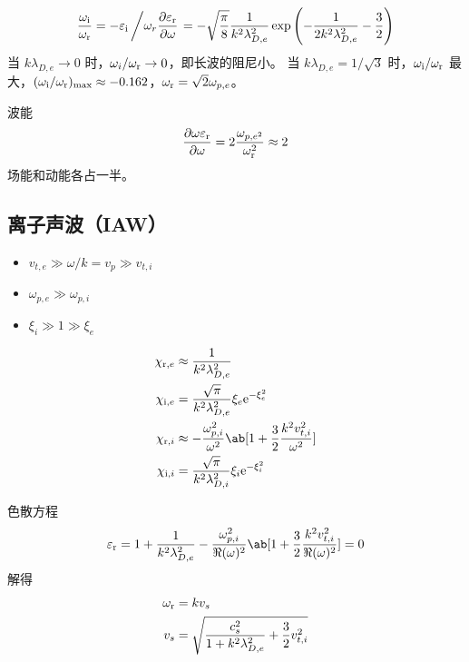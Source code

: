 \begin{equation}
\frac{\omega_{\mathrm{i}}}{\omega_{\mathrm{r}}} = - \varepsilon_{\mathrm{i}} \left/ \omega_r \pdv{\varepsilon_{\mathrm{r}}}{\omega}\right.
= - \sqrt{\frac{\pi}{8}} \frac{1}{k^2 \lambda_{D,e}^2} \exp\left(- \frac{1}{2 k^2 \lambda_{D,e}^2} - \frac{3}{2}\right)
\end{equation}
当 $k \lambda_{D,e} \to 0$ 时，$\omega_i / \omega_{\mathrm{r}} \to 0$，即长波的阻尼小。
当 $k \lambda_{D,e} = 1 / \sqrt{3}{}$ 时，$\omega_{\mathrm{i}} / \omega_{\mathrm{r}}$ 最大，$(\omega_{\mathrm{i}} / \omega_{\mathrm{r}})_{\max} \approx -0.162$，$\omega_{\mathrm{r}}=\sqrt{2} \omega_{p,e}$。

波能
\begin{equation}
\pdv{\omega \varepsilon_{\mathrm{r}}}{\omega}
= 2 \frac{\omega_{p,e^2}}{\omega_{\mathrm{r}}^2}
\approx 2
\end{equation}
场能和动能各占一半。

\subsection{离子声波（IAW）}

\begin{itemize}
    \item $v_{t,e} \gg \omega / k = v_p \gg v_{t,i}$
    \item $\omega_{p,e} \gg \omega_{p,i}$
    \item $\xi_i \gg 1 \gg \xi_e$
\end{itemize}

\begin{subequations}\begin{align}
\chi_{\re,e} &\approx \frac{1}{k^2 \lambda_{D,e}^2} \\
\chi_{\im,e} &= \frac{\sqrt\pi}{k^2 \lambda_{D,e}^2}
    \xi_e \eu^{- \xi_e^2} \\
\chi_{\re,i} &\approx - \frac{\omega_{p,i}^2}{\omega^2}
    \ab[1 + \frac32 \frac{k^2 v_{t,i}^2}{\omega^2}] \\
\chi_{\im,i} &= \frac{\sqrt\pi}{k^2 \lambda_{D,i}^2}
    \xi_i \eu^{- \xi_i^2}
\end{align}\end{subequations}

色散方程
\begin{equation}
\varepsilon_\re
= 1 + \frac{1}{k^2 \lambda_{D,e}^2}
- \frac{\omega_{p,i}^2}{\Re(\omega)^2}
\ab[1 + \frac32 \frac{k^2 v_{t,i}^2}{\Re(\omega)^2}]
= 0
\end{equation}
解得
\begin{subequations}\begin{align}
\omega_{\mathrm{r}} &= k v_s \\
v_s &= \sqrt{
    \frac{c_s^2}{1 + k^2 \lambda_{D,e}^2} + \frac32 v_{t,i}^2
}
\end{align}\end{subequations}

